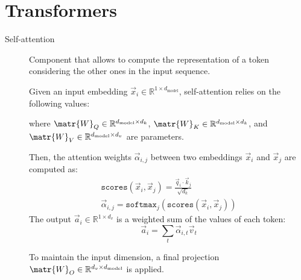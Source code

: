 \section{Transformers}

\begin{description}
    \item[Self-attention] 
        Component that allows to compute the representation of a token considering the other ones in the input sequence. 
        
        Given an input embedding $\vec{x}_i \in \mathbb{R}^{1 \times d_\text{model}}$, self-attention relies on the following values:
        where $\matr{W}_Q \in \mathbb{R}^{d_\text{model} \times d_k}$, $\matr{W}_K \in \mathbb{R}^{d_\text{model} \times d_k}$, and $\matr{W}_V \in \mathbb{R}^{d_\text{model} \times d_v}$ are parameters.

        Then, the attention weights $\vec{\alpha}_{i,j}$ between two embeddings $\vec{x}_i$ and $\vec{x}_j$ are computed as:
        \[
            \begin{gathered}
                \texttt{scores}(\vec{x}_i, \vec{x}_j) = \frac{\vec{q}_i \cdot \vec{k}_j}{\sqrt{d_k}} \\
                \vec{\alpha}_{i,j} = \texttt{softmax}_j\left( \texttt{scores}(\vec{x}_i, \vec{x}_j) \right)
            \end{gathered}
        \]
        The output $\vec{a}_i \in \mathbb{R}^{1 \times d_v}$ is a weighted sum of the values of each token:
        \[ \vec{a}_i = \sum_{t} \vec{\alpha}_{i,t} \vec{v}_t \]

        To maintain the input dimension, a final projection $\matr{W}_O \in \mathbb{R}^{d_v \times d_\text{model}}$ is applied.


\end{description}
